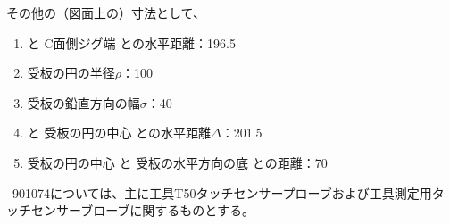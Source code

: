 \clearpage
\begin{hosoku}
その他の（図面上の）寸法として、
\begin{enumerate}[label=\sarrow]
\item \TableCenter と C面側ジグ端 との水平距離：196.5
\item 受板の円の半径$\rho$：100
\item 受板の鉛直方向の幅$\sigma$：40
\item \TableCenter と 受板の円の中心 との水平距離$\Delta$：201.5
\item 受板の円の中心 と 受板の水平方向の底 との距離：70
\end{enumerate}
\end{hosoku}



\clearpage
\,-\ttNum901074については、主に工具{\ttfamily T50}タッチセンサープローブおよび工具測定用タッチセンサーブローブに関するものとする。


